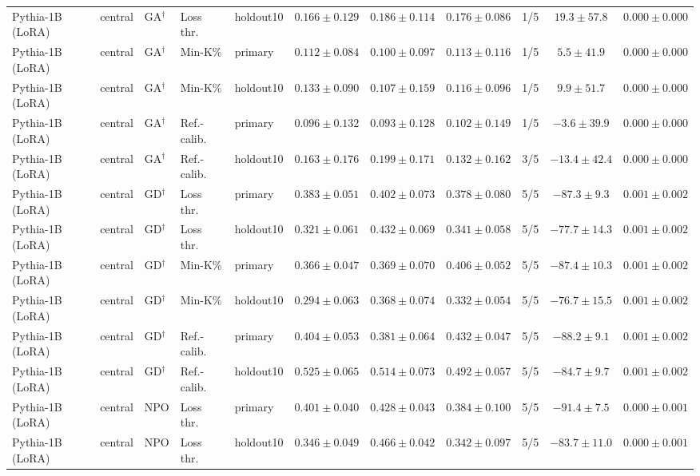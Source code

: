 \begin{table}[t]
\begin{tabular*}{\textwidth}{@{\extracolsep{\fill}}lllllcccccc@{}}
Pythia-1B (LoRA) & central & GA$^{\dagger}$ & Loss thr. & holdout10 & $0.166 \pm 0.129$ & $0.186 \pm 0.114$ & $0.176 \pm 0.086$ & 1/5 & $19.3 \pm 57.8$ & $0.000 \pm 0.000$ \\
Pythia-1B (LoRA) & central & GA$^{\dagger}$ & Min-K\% & primary & $0.112 \pm 0.084$ & $0.100 \pm 0.097$ & $0.113 \pm 0.116$ & 1/5 & $5.5 \pm 41.9$ & $0.000 \pm 0.000$ \\
Pythia-1B (LoRA) & central & GA$^{\dagger}$ & Min-K\% & holdout10 & $0.133 \pm 0.090$ & $0.107 \pm 0.159$ & $0.116 \pm 0.096$ & 1/5 & $9.9 \pm 51.7$ & $0.000 \pm 0.000$ \\
Pythia-1B (LoRA) & central & GA$^{\dagger}$ & Ref.-calib. & primary & $0.096 \pm 0.132$ & $0.093 \pm 0.128$ & $0.102 \pm 0.149$ & 1/5 & $-3.6 \pm 39.9$ & $0.000 \pm 0.000$ \\
Pythia-1B (LoRA) & central & GA$^{\dagger}$ & Ref.-calib. & holdout10 & $0.163 \pm 0.176$ & $0.199 \pm 0.171$ & $0.132 \pm 0.162$ & 3/5 & $-13.4 \pm 42.4$ & $0.000 \pm 0.000$ \\
Pythia-1B (LoRA) & central & GD$^{\dagger}$ & Loss thr. & primary & $0.383 \pm 0.051$ & $0.402 \pm 0.073$ & $0.378 \pm 0.080$ & 5/5 & $-87.3 \pm 9.3$ & $0.001 \pm 0.002$ \\
Pythia-1B (LoRA) & central & GD$^{\dagger}$ & Loss thr. & holdout10 & $0.321 \pm 0.061$ & $0.432 \pm 0.069$ & $0.341 \pm 0.058$ & 5/5 & $-77.7 \pm 14.3$ & $0.001 \pm 0.002$ \\
Pythia-1B (LoRA) & central & GD$^{\dagger}$ & Min-K\% & primary & $0.366 \pm 0.047$ & $0.369 \pm 0.070$ & $0.406 \pm 0.052$ & 5/5 & $-87.4 \pm 10.3$ & $0.001 \pm 0.002$ \\
Pythia-1B (LoRA) & central & GD$^{\dagger}$ & Min-K\% & holdout10 & $0.294 \pm 0.063$ & $0.368 \pm 0.074$ & $0.332 \pm 0.054$ & 5/5 & $-76.7 \pm 15.5$ & $0.001 \pm 0.002$ \\
Pythia-1B (LoRA) & central & GD$^{\dagger}$ & Ref.-calib. & primary & $0.404 \pm 0.053$ & $0.381 \pm 0.064$ & $0.432 \pm 0.047$ & 5/5 & $-88.2 \pm 9.1$ & $0.001 \pm 0.002$ \\
Pythia-1B (LoRA) & central & GD$^{\dagger}$ & Ref.-calib. & holdout10 & $0.525 \pm 0.065$ & $0.514 \pm 0.073$ & $0.492 \pm 0.057$ & 5/5 & $-84.7 \pm 9.7$ & $0.001 \pm 0.002$ \\
Pythia-1B (LoRA) & central & NPO & Loss thr. & primary & $0.401 \pm 0.040$ & $0.428 \pm 0.043$ & $0.384 \pm 0.100$ & 5/5 & $-91.4 \pm 7.5$ & $0.000 \pm 0.001$ \\
Pythia-1B (LoRA) & central & NPO & Loss thr. & holdout10 & $0.346 \pm 0.049$ & $0.466 \pm 0.042$ & $0.342 \pm 0.097$ & 5/5 & $-83.7 \pm 11.0$ & $0.000 \pm 0.001$ \\

\end{tabular*}
\end{table}
